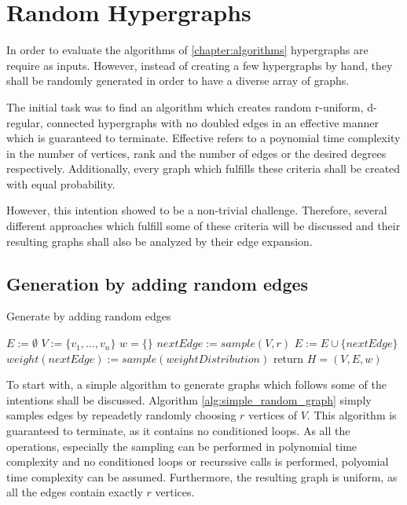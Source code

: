 \chapter{Random Hypergraphs}\label{chapter:random_hypergraphs}
In order to evaluate the algorithms of \cref{chapter:algorithms} hypergraphs are require as inputs. However, instead of creating a few hypergraphs by hand, they shall be randomly generated in order to have a diverse array of graphs.

The initial task was to find an algorithm which creates random r-uniform, d-regular, connected hypergraphs with no doubled edges in an effective manner which is guaranteed to terminate. Effective refers to a poynomial time complexity in the number of vertices, rank and the number of edges or the desired degrees respectively. Additionally, every graph which fulfills these criteria shall be created with equal probability.

However, this intention showed to be a non-trivial challenge. Therefore, several different approaches which fulfill some of these criteria will be discussed and their resulting graphs shall also be analyzed by their edge expansion.

\section{Generation by adding random edges}
\begin{algorithm}[htpb]
	\caption{Generate by adding random edges\label{alg:simple_random_graph}} 
	\begin{algorithmic}
		\State $E := \emptyset$
		\State $V := \{v_1, \ldots, v_n\}$
		\State $w = \{\}$
		\State $nextEdge := sample(V, r) $
		\State $E := E \cup	 \{nextEdge\}$ %
		\State $weight(nextEdge) := sample(weightDistribution)$ 
		\EndFor
		\State return $H = (V, E, w)$
		\EndFunction 
	\end{algorithmic}
\end{algorithm}	
To start with, a simple algorithm to generate graphs which follows some of the intentions shall be discussed. Algorithm \ref{alg:simple_random_graph} simply samples edges by repeadetly randomly choosing $r$ vertices of $V$.%
This algorithm is guaranteed to terminate, as it contains no conditioned loops. As all the operations, especially the sampling can be performed in polynomial time complexity and no conditioned loops or recurssive calls is performed, polyomial time complexity can be assumed. Furthermore, the resulting graph is uniform, as all the edges contain exactly $r$ vertices. 

